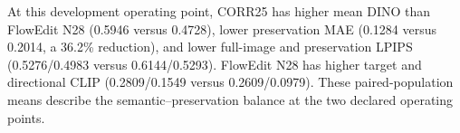 At this development operating point, CORR25 has higher mean DINO than FlowEdit N28 (0.5946 versus 0.4728), lower preservation MAE (0.1284 versus 0.2014, a 36.2\% reduction), and lower full-image and preservation LPIPS (0.5276/0.4983 versus 0.6144/0.5293). FlowEdit N28 has higher target and directional CLIP (0.2809/0.1549 versus 0.2609/0.0979). These paired-population means describe the semantic--preservation balance at the two declared operating points.
